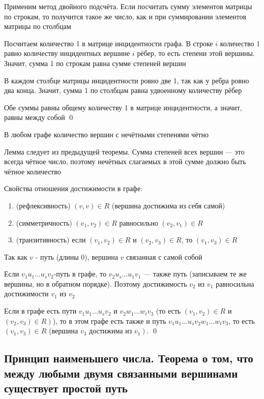 \documentclass[a4paper]{article}
\begin{document}
\proof Применим метод двойного подсчёта. Если посчитать сумму элементов матрицы по строкам, то получится такое же число, как и при суммировании элементов матрицы по столбцам

Посчитаем количество 1 в матрице инцидентности графа. В строке $i$ количество 1 равно количеству инцидентных вершине $i$ рёбер, то есть степени этой вершины. Значит, сумма 1 по строкам равна сумме степеней вершин

В каждом столбце матрицы инцидентности ровно две 1, так как у ребра ровно два конца. Значит, сумма 1 по столбцам равна удвоенному количеству рёбер

Обе суммы равны общему количеству 1 в матрице инцидентности, а значит, равны между собой \qed

\lemma В любом графе количество вершин с нечётными степенями чётно

\proof Лемма следует из предыдущей теоремы. Сумма степеней всех вершин — это всегда чётное число, поэтому нечётных слагаемых в этой сумме должно быть чётное количество

\lemma Свойства отношения достижимости в графе:
\begin{enumerate}
    \item (рефлексивность) $(v, v) \in R$ (вершина достижима из себя самой)
    \item (симметричность) $(v_1, v_2) \in R$ равносильно $(v_2, v_1) \in R$
    \item (транзитивность) если $(v_1, v_2) \in R$ и $(v_2, v_3)\in R$, то $(v_1, v_3) \in R$
\end{enumerate}

\proof Так как $v$ - путь (длины 0), вершина $v$ связанная с самой собой

Если $v_{1} u_{1} \ldots u_{s} v_{2}$-путь в графе, то $v_{2} u_{s} \ldots u_{1} v_{1}$ — также путь (записываем те же вершины, но в обратном порядке). Поэтому достижимость $v_{2}$ из $v_{1}$ равносильна достижимости $v_{1}$ из $v_{2}$

Если в графе есть пути $v_{1} u_{1} \ldots u_{s} v_{2}$ и $v_{2} w_{1} \ldots w_{t} v_{3}$ (то есть $\left(v_{1}, v_{2}\right) \in R$ и $\left.\left(v_{2}, v_{3}\right) \in R\right)$), то в этом графе есть также и путь $v_{1} u_{1} \ldots u_{s} v_{2} w_{1} \ldots w_{t} v_{3}$, то есть $\left(v_{1}, v_{3}\right) \in R$ (вершина $v_{3}$ достижима из $\left.v_{1}\right)$. \qed\\[2mm]

\subsection{Принцип наименьшего числа. Теорема о том, что между любыми двумя связанными вершинами существует простой путь}
\end{document}
